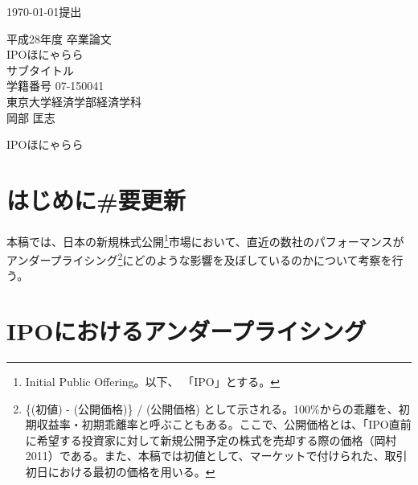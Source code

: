 \documentclass{jsarticle}
\begin{document}
\renewcommand\thefootnote{\arabic{footnote})}



{\Large \today 提出}\\ %

\begin{center}
\vspace{120truept}
{\huge 平成28年度 卒業論文\\[10mm]
IPOほにゃらら}\\ %
\vspace{10truept}
{\Large サブタイトル}\\ %
\vspace{120truept}
{\huge 学籍番号 07-150041}\\ %
\vspace{50truept}
{\huge 東京大学経済学部経済学科\\[50truept]
岡部 匡志}\\ %

\end{center}
\newpage
\begin{center}
{\Large IPOほにゃらら}\\ %
\end{center}

\tableofcontents

\vspace{120truept}
\section{はじめに\#要更新}
本稿では、日本の新規株式公開\footnote[1]{Initial Public Offering。以下、 「IPO」とする。}市場において、直近の数社のパフォーマンスがアンダープライシング\footnote[2]{\{(初値) - (公開価格)\} / (公開価格) として示される。100\%からの乖離を、初期収益率・初期乖離率と呼ぶこともある。ここで、公開価格とは、「IPO直前に希望する投資家に対して新規公開予定の株式を売却する際の価格（岡村 2011\cite{okamura}）である。また、本稿では初値として、マーケットで付けられた、取引初日における最初の価格を用いる。}にどのような影響を及ぼしているのかについて考察を行う。
\section{IPOにおけるアンダープライシング}
\end{document}
